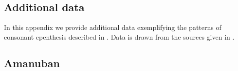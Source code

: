 \documentclass[output=paper]{langscibook}
\begin{document}
\begin{paperappendix}
\section{Additional data}\label{sec:AddDat}
In this appendix we provide additional data
exemplifying the patterns of consonant epenthesis described in .
Data is drawn from the sources given in .

\subsection{Amanuban}
~\largerpage[2]


\end{paperappendix}
\end{document}
